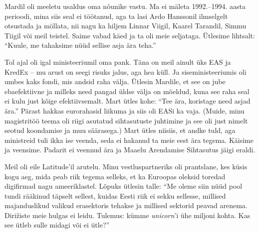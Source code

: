 
Mardil oli meeletu usaldus oma nõunike vastu. Ma ei mäleta 1992.--1994. aasta 
perioodi, mina siis seal ei töötanud, aga ta lasi Ardo 
Hanssonil ilmselgelt otsustada ja möllata, nii nagu 
ka hiljem Linnar Viigil, Kaarel 
Tarandil, Simmu Tiigil 
või meil teistel. Saime vabad käed ja ta oli meie seljataga. Ütlesime lihtsalt: \enquote{Kuule, me tahaksime nüüd sellise asja ära 
teha.} 

Tol ajal oli igal ministeeriumil oma pank. Täna on meil 
ainult üks EAS ja KredEx -- mu arust on seegi risuks jalus, aga hea küll. 
Ja siseministeeriumis oli umbes kaks fondi, mis andsid raha 
välja. Ütlesin Mardile, et see on jube ebaefektiivne ja 
milleks need pangad üldse välja on mõeldud, kuna see raha 
seal ei kulu just kõige efektiivsemalt. Mart ütles kohe: \enquote{Tee ära, 
koristage need asjad ära.} Pärast hakkas eurorahasid liikuma ja siis oli 
EASi ka vaja. (Muide, minu magistritöö teema oli riigi asutatud 
sihtasutuste juhtimine ja see oli just nimelt seotud koondamise ja muu säärasega.) Mart ütles niisiis, et andke tuld, aga ministreid tuli ikka 
ise veenda, seda ei hakanud ta meie eest ära tegema. Käisime ja veensime. Padarit ei veennud ära ja Maaelu 
Arendamise Sihtasutus jäigi eraldi.


Meil oli eile Latitude'il arutelu. Minu vestluspartneriks oli prantslane, kes küsis 
kogu aeg, mida peab riik tegema selleks, et ka Euroopas oleksid toredad digifirmad nagu ameeriklastel. Lõpuks
ütlesin talle: \enquote{Me oleme siin nüüd pool tundi rääkinud täpselt sellest, 
kuidas Eesti riik ei sekku sellesse, millised majanduslikud valikud 
erasektoris tehakse ja millised sektorid peavad arenema. 
Dirižiste meie hulgas ei leidu. Tulemus: kümme
\emph{unicorn}'i ühe miljoni kohta. Kas see ütleb sulle midagi või ei ütle?} 

